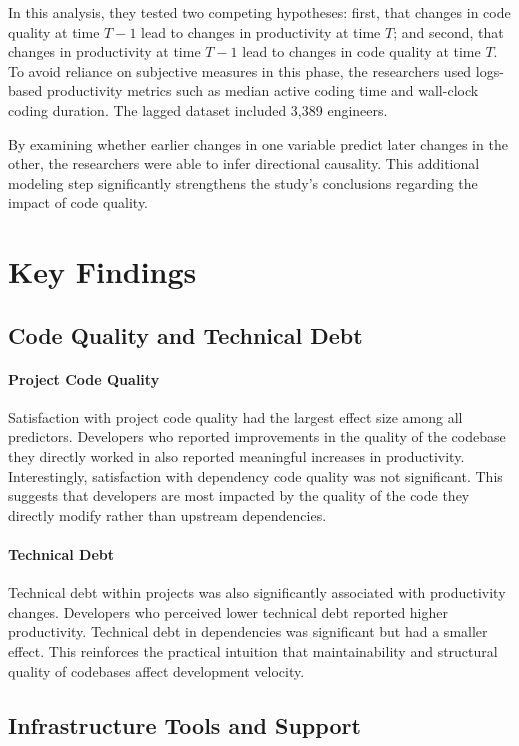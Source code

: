 In this analysis, they tested two competing hypotheses: first, that changes in code quality at time $T-1$ lead to changes in productivity at time $T$; and second, that changes in productivity at time $T-1$ lead to changes in code quality at time $T$. To avoid reliance on subjective measures in this phase, the researchers used logs-based productivity metrics such as median active coding time and wall-clock coding duration. The lagged dataset included 3,389 engineers.

By examining whether earlier changes in one variable predict later changes in the other, the researchers were able to infer directional causality. This additional modeling step significantly strengthens the study’s conclusions regarding the impact of code quality.

\section{Key Findings}
\subsection{Code Quality and Technical Debt}
\paragraph{Project Code Quality}
Satisfaction with project code quality had the largest effect size among all predictors. Developers who reported improvements in the quality of the codebase they directly worked in also reported meaningful increases in productivity. Interestingly, satisfaction with dependency code quality was not significant. This suggests that developers are most impacted by the quality of the code they directly modify rather than upstream dependencies.

\paragraph{Technical Debt}
Technical debt within projects was also significantly associated with productivity changes. Developers who perceived lower technical debt reported higher productivity. Technical debt in dependencies was significant but had a smaller effect. This reinforces the practical intuition that maintainability and structural quality of codebases affect development velocity.

\subsection{Infrastructure Tools and Support}
